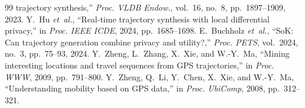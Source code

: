 \documentclass[11pt]{article}
\begin{document}
\begin{thebibliography}{99}
trajectory synthesis,'' \emph{Proc. VLDB Endow.}, vol.~16, no.~8, pp.~1897--1909,
2023.
 Y.~Hu \emph{et~al.}, ``Real-time trajectory synthesis with local
differential privacy,'' in \emph{Proc. IEEE ICDE}, 2024, pp.~1685--1698.
 E.~Buchholz \emph{et~al.}, ``SoK: Can trajectory generation
combine privacy and utility?,'' \emph{Proc. PETS}, vol.~2024, no.~3, pp.~75--93,
2024.
 Y.~Zheng, L.~Zhang, X.~Xie, and W.-Y.~Ma, ``Mining interesting
locations and travel sequences from GPS trajectories,'' in \emph{Proc. WWW}, 2009,
pp.~791--800.
 Y.~Zheng, Q.~Li, Y.~Chen, X.~Xie, and W.-Y.~Ma, ``Understanding
mobility based on GPS data,'' in \emph{Proc. UbiComp}, 2008, pp.~312--321.
\end{thebibliography}
\end{document}
